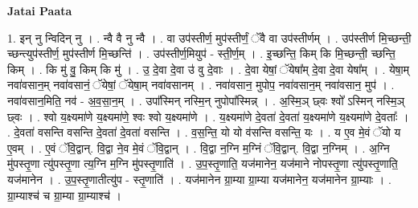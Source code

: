 \documentclass[17pt]{extarticle}
\begin{document}
\textbf{Jatai Paata} \newline

1. इन् नु न्विदिन् नु । . न्वै वै नु न्वै । . वा उप॑स्तीर्ण॒ मुप॑स्तीर्णं॒ ॅवै वा उप॑स्तीर्णम् । . उप॑स्तीर्ण मि॒च्छन्ती॒ च्छन्त्युप॑स्तीर्ण॒ मुप॑स्तीर्ण मि॒च्छन्ति॑ । . उप॑स्तीर्ण॒मियुप॑ - स्ती॒र्ण॒म् । . इ॒च्छन्ति॒ किम् कि मि॒च्छन्ती॒ च्छन्ति॒ किम् । . कि मु॑ वु॒ किम् कि मु॑ । . उ॒ दे॒वा दे॒वा उ॑ वु दे॒वाः । . दे॒वा येषां॒ ॅयेषा᳚म् दे॒वा दे॒वा येषा᳚म् । . येषा॒म् नवा॑वसान॒म् नवा॑वसानं॒ ॅयेषां॒ ॅयेषा॒म् नवा॑वसानम् । . नवा॑वसान॒ मुपोप॒ नवा॑वसान॒म् नवा॑वसान॒ मुप॑ । . नवा॑वसान॒मिति॒ नव॑ - अ॒व॒सा॒न॒म् । . उपा᳚स्मिन् नस्मि॒न् नुपोपा᳚स्मिन्न् । . अ॒स्मि॒ञ् छ्वः श्वो᳚ ऽस्मिन् नस्मि॒ञ् छ्वः । . श्वो य॒क्ष्यमा॑णे य॒क्ष्यमा॑णे॒ श्वः श्वो य॒क्ष्यमा॑णे । . य॒क्ष्यमा॑णे दे॒वता॑ दे॒वता॑ य॒क्ष्यमा॑णे य॒क्ष्यमा॑णे दे॒वताः᳚ । . दे॒वता॑ वसन्ति वसन्ति दे॒वता॑ दे॒वता॑ वसन्ति । . व॒स॒न्ति॒ यो यो व॑सन्ति वसन्ति॒ यः । . य ए॒व मे॒वं ॅयो य ए॒वम् । . ए॒वं ॅवि॒द्वान्. वि॒द्वा ने॒व मे॒वं ॅवि॒द्वान् । . वि॒द्वा न॒ग्नि म॒ग्निं ॅवि॒द्वान्. वि॒द्वा न॒ग्निम् । . अ॒ग्नि मु॑पस्तृ॒णा त्यु॑पस्तृ॒णा त्य॒ग्नि म॒ग्नि मु॑पस्तृ॒णाति॑ । . उ॒प॒स्तृ॒णाति॒ यज॑मानेन॒ यज॑माने नोपस्तृ॒णा त्यु॑पस्तृ॒णाति॒ यज॑मानेन । . उ॒प॒स्तृ॒णातीत्यु॑प - स्तृ॒णाति॑ । . यज॑मानेन ग्रा॒म्या ग्रा॒म्या यज॑मानेन॒ यज॑मानेन ग्रा॒म्याः । . ग्रा॒म्याश्च॑ च ग्रा॒म्या ग्रा॒म्याश्च॑ । \newline
\end{document}
